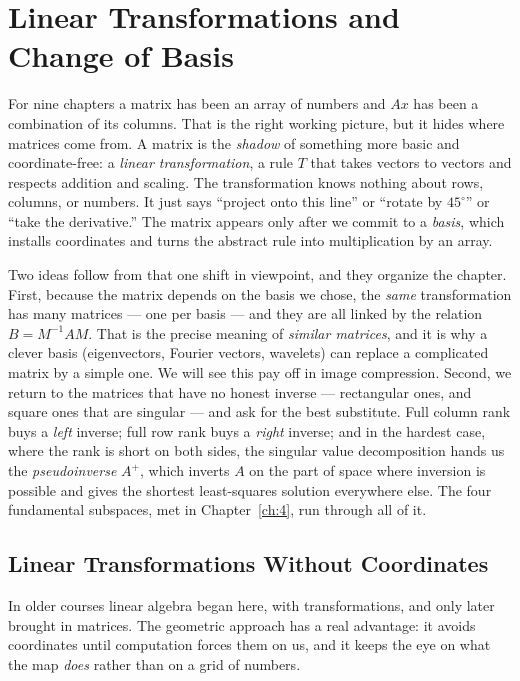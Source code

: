 \chapter{Linear Transformations and Change of Basis}
\label{ch:10}

For nine chapters a matrix has been an array of numbers and $Ax$ has been a combination of its columns. That is the right working picture, but it hides where matrices come from. A matrix is the \emph{shadow} of something more basic and coordinate-free: a \emph{linear transformation}, a rule $T$ that takes vectors to vectors and respects addition and scaling. The transformation knows nothing about rows, columns, or numbers. It just says ``project onto this line'' or ``rotate by $45^\circ$'' or ``take the derivative.'' The matrix appears only after we commit to a \emph{basis}, which installs coordinates and turns the abstract rule into multiplication by an array.

Two ideas follow from that one shift in viewpoint, and they organize the chapter. First, because the matrix depends on the basis we chose, the \emph{same} transformation has many matrices --- one per basis --- and they are all linked by the relation $B = M^{-1}AM$. That is the precise meaning of \emph{similar matrices}, and it is why a clever basis (eigenvectors, Fourier vectors, wavelets) can replace a complicated matrix by a simple one. We will see this pay off in image compression. Second, we return to the matrices that have no honest inverse --- rectangular ones, and square ones that are singular --- and ask for the best substitute. Full column rank buys a \emph{left} inverse; full row rank buys a \emph{right} inverse; and in the hardest case, where the rank is short on both sides, the singular value decomposition hands us the \emph{pseudoinverse} $A^{+}$, which inverts $A$ on the part of space where inversion is possible and gives the shortest least-squares solution everywhere else. The four fundamental subspaces, met in Chapter~\ref{ch:4}, run through all of it.

\section{Linear Transformations Without Coordinates}

In older courses linear algebra began here, with transformations, and only later brought in matrices. The geometric approach has a real advantage: it avoids coordinates until computation forces them on us, and it keeps the eye on what the map \emph{does} rather than on a grid of numbers.

